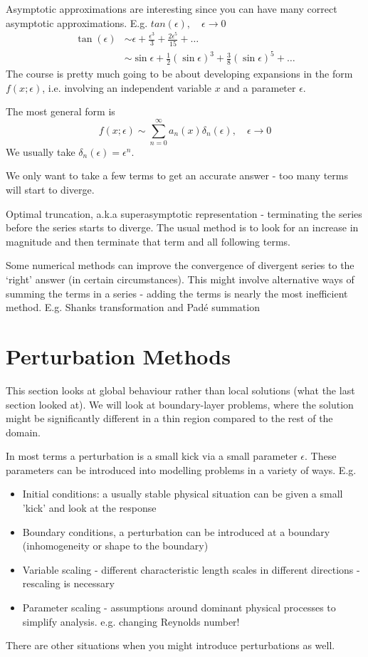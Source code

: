 \documentclass{X:/Documents/Coding/Latex/myassignment}
\begin{document}
Asymptotic approximations are interesting since you can have many correct asymptotic approximations. E.g. $tan(\epsilon), \quad \epsilon\to 0$
\begin{align*}
    \tan(\epsilon)&\sim \epsilon + \frac{\epsilon^3}{3} + \frac{2\epsilon^5}{15} + \hdots\\
    &\sim \sin\epsilon + \frac12 (\sin \epsilon)^3 + \frac{3}{8}(\sin\epsilon)^5 +\hdots
\end{align*}
The course is pretty much going to be about developing expansions in the form $f(x;\epsilon)$, i.e. involving an independent variable $x$ and a parameter $\epsilon$.

The most general form is
\[f(x;\epsilon) \sim \sum_{n=0}^\infty a_n(x) \delta_n(\epsilon), \quad \epsilon\to0\]
We usually take $\delta_n(\epsilon) = \epsilon^n$.

We only want to take a few terms to get an accurate answer - too many terms will start to diverge.



Optimal truncation, a.k.a superasymptotic representation - terminating the series before the series starts to diverge. The usual method is to look for an increase in magnitude and then terminate that term and all following terms.

Some numerical methods can improve the convergence of divergent series to the `right' answer (in certain circumstances). This might involve alternative ways of summing the terms in a series - adding the terms is nearly the most inefficient method. E.g. Shanks transformation and Pad\'e summation


\section{Perturbation Methods}

This section looks at global behaviour rather than local solutions (what the last section looked at). We will look at boundary-layer problems, where the solution might be significantly different in a thin region compared to the rest of the domain. 

In most terms a perturbation is a small kick via a small parameter $\epsilon$. These parameters can be introduced into modelling problems in a variety of ways. E.g.
\begin{itemize}
    \item Initial conditions: a usually stable physical situation can be given a small 'kick' and look at the response
    \item Boundary conditions, a perturbation can be introduced at a boundary (inhomogeneity or shape to the boundary)
    \item Variable scaling - different characteristic length scales in different directions - rescaling is necessary
    \item Parameter scaling - assumptions around dominant physical processes to simplify analysis. e.g. changing Reynolds number! 
\end{itemize}
There are other situations when you might introduce perturbations as well.
\end{document}
